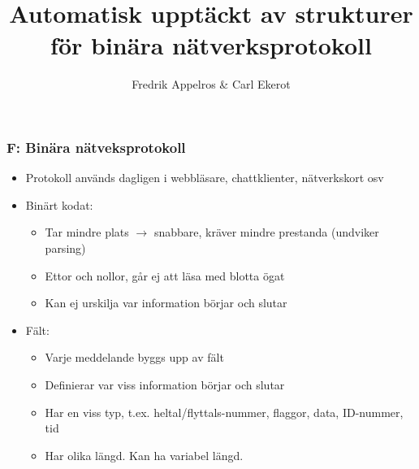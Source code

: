 \documentclass[xetex, 8pt]{beamer}
\title{Automatisk upptäckt av strukturer för binära nätverksprotokoll}
\author{Fredrik Appelros \& Carl Ekerot}
\date
\begin{document}
    \frame{\titlepage}
    
    \begin{frame}
        \frametitle{F: Binära nätveksprotokoll}
        \begin{itemize}
            \item Protokoll används dagligen i webbläsare, chattklienter, nätverkskort osv
            \item Binärt kodat:
                \begin{itemize}
                    \item Tar mindre plats $\rightarrow$ snabbare, kräver mindre prestanda (undviker parsing)
                    \item Ettor och nollor, går ej att läsa med blotta ögat
                    \item Kan ej urskilja var information börjar och slutar
                \end{itemize}
            \item Fält:
                \begin{itemize}
                    \item Varje meddelande byggs upp av fält
                    \item Definierar var viss information börjar och slutar
                    \item Har en viss typ, t.ex. heltal/flyttals-nummer, flaggor, data, ID-nummer, tid
                    \item Har olika längd. Kan ha variabel längd.
                \end{itemize}
        \end{itemize}
    \end{frame}
\end{document}
